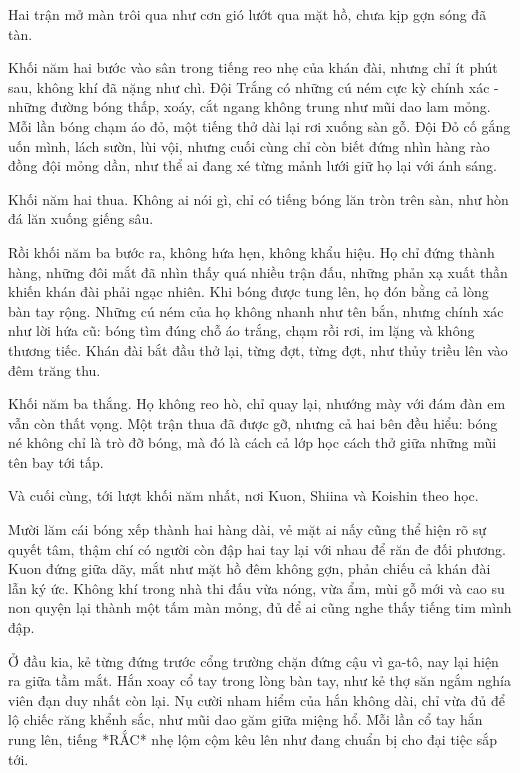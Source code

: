 \documentclass[../main.tex]{subfiles}
\begin{document}
\ct

Hai trận mở màn trôi qua như cơn gió lướt qua mặt hồ, chưa kịp gợn sóng đã tàn.

Khối năm hai bước vào sân trong tiếng reo nhẹ của khán đài, nhưng chỉ ít phút sau, không khí đã nặng như chì. Đội Trắng có những cú ném cực kỳ chính xác - những đường bóng thấp, xoáy, cắt ngang không trung như mũi dao lam mỏng. Mỗi lần bóng chạm áo đỏ, một tiếng thở dài lại rơi xuống sàn gỗ. Đội Đỏ cố gắng uốn mình, lách sườn, lùi vội, nhưng cuối cùng chỉ còn biết đứng nhìn hàng rào đồng đội mỏng dần, như thể ai đang xé từng mảnh lưới giữ họ lại với ánh sáng.

Khối năm hai thua. Không ai nói gì, chỉ có tiếng bóng lăn tròn trên sàn, như hòn đá lăn xuống giếng sâu.

Rồi khối năm ba bước ra, không hứa hẹn, không khẩu hiệu. Họ chỉ đứng thành hàng, những đôi mắt đã nhìn thấy quá nhiều trận đấu, những phản xạ xuất thần khiến khán đài phải ngạc nhiên. Khi bóng được tung lên, họ đón bằng cả lòng bàn tay rộng. Những cú ném của họ không nhanh như tên bắn, nhưng chính xác như lời hứa cũ: bóng tìm đúng chỗ áo trắng, chạm rồi rơi, im lặng và không thương tiếc. Khán đài bắt đầu thở lại, từng đợt, từng đợt, như thủy triều lên vào đêm trăng thu.

Khối năm ba thắng. Họ không reo hò, chỉ quay lại, nhướng mày với đám đàn em vẫn còn thất vọng. Một trận thua đã được gỡ, nhưng cả hai bên đều hiểu: bóng né không chỉ là trò đỡ bóng, mà đó là cách cả lớp học cách thở giữa những mũi tên bay tới tấp.

Và cuối cùng, tới lượt khối năm nhất, nơi Kuon, Shiina và Koishin theo học.

Mười lăm cái bóng xếp thành hai hàng dài, vẻ mặt ai nấy cũng thể hiện rõ sự quyết tâm, thậm chí có người còn đập hai tay lại với nhau để răn đe đối phương. Kuon đứng giữa dãy, mắt như mặt hồ đêm không gợn, phản chiếu cả khán đài lẫn ký ức. Không khí trong nhà thi đấu vừa nóng, vừa ẩm, mùi gỗ mới và cao su non quyện lại thành một tấm màn mỏng, đủ để ai cũng nghe thấy tiếng tim mình đập.

Ở đầu kia, kẻ từng đứng trước cổng trường chặn đứng cậu vì ga-tô, nay lại hiện ra giữa tầm mắt. Hắn xoay cổ tay trong lòng bàn tay, như kẻ thợ săn ngắm nghía viên đạn duy nhất còn lại. Nụ cười nham hiểm của hắn không dài, chỉ vừa đủ để lộ chiếc răng khểnh sắc, như mũi dao găm giữa miệng hổ. Mỗi lần cổ tay hắn rung lên, tiếng *RẮC* nhẹ lộm cộm kêu lên như đang chuẩn bị cho đại tiệc sắp tới.
\end{document}
